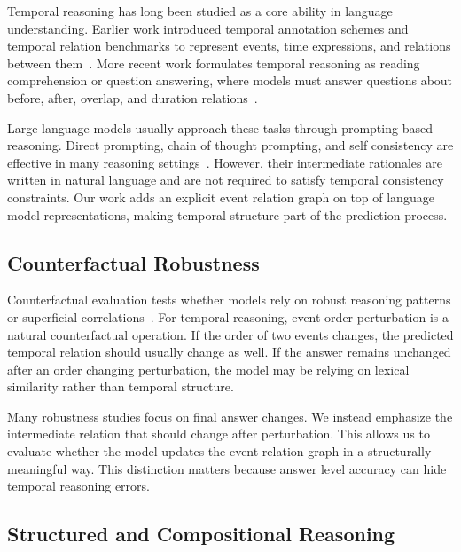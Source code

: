 \documentclass[11pt]{article}
\begin{document}
Temporal reasoning has long been studied as a core ability in language understanding. Earlier work introduced temporal annotation schemes and temporal relation benchmarks to represent events, time expressions, and relations between them~\citep{allen1983maintaining,pustejovsky2003timeml,pustejovsky2010isotimeml,uzzaman2013tempeval3}. More recent work formulates temporal reasoning as reading comprehension or question answering, where models must answer questions about before, after, overlap, and duration relations~\citep{ning2020torque,jia2018tempquestions,chen2021timeqa,zhang2021situatedqa}.

Large language models usually approach these tasks through prompting based reasoning. Direct prompting, chain of thought prompting, and self consistency are effective in many reasoning settings~\citep{wei2022chain,wang2023selfconsistency}. However, their intermediate rationales are written in natural language and are not required to satisfy temporal consistency constraints. Our work adds an explicit event relation graph on top of language model representations, making temporal structure part of the prediction process.

\subsection{Counterfactual Robustness}

Counterfactual evaluation tests whether models rely on robust reasoning patterns or superficial correlations~\citep{mccoy2019right,kaushik2020learning,gardner2020evaluating,ribeiro2020beyond}. For temporal reasoning, event order perturbation is a natural counterfactual operation. If the order of two events changes, the predicted temporal relation should usually change as well. If the answer remains unchanged after an order changing perturbation, the model may be relying on lexical similarity rather than temporal structure.

Many robustness studies focus on final answer changes. We instead emphasize the intermediate relation that should change after perturbation. This allows us to evaluate whether the model updates the event relation graph in a structurally meaningful way. This distinction matters because answer level accuracy can hide temporal reasoning errors.

\subsection{Structured and Compositional Reasoning}
\end{document}
